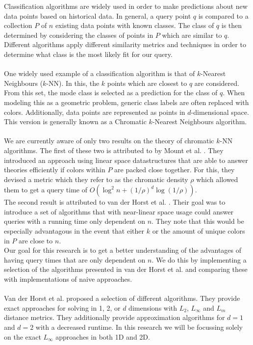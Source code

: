 \documentclass{article}
\newcommand{\fb}[1]{{\color{blue}#1}}
\begin{document}
\fb{
    Classification algorithms are widely used in order to make predictions about new data points based on historical data. In general, a query point $q$ is compared to a collection $P$ of $n$ existing data points with known classes. The class of $q$ is then determined by considering the classes of points in $P$ which are similar to $q$. Different algorithms apply different similarity metrics and techniques in order to determine what class is the most likely fit for our query. \\\\
    One widely used example of a classification algorithm is that of $k$-Nearest Neighbours ($k$-NN). In this, the $k$ points which are closest to $q$ are considered. From this set, the mode class is selected as a prediction for the class of $q$. When modeling this as a geometric problem, generic class labels are often replaced with colors. Additionally, data points are represented as points in $d$-dimensional space. This version is generally known as a Chromatic $k$-Nearest Neighbours algorithm. \\\\
    We are currently aware of only two results on the theory of chromatic $k$-NN algorithms. The first of these two is attributed to by Mount et al. \cite{MOUNT200097}. They introduced an approach using linear space datastructures that are able to answer theories efficiently if colors within $P$ are packed close together. For this, they devised a metric which they refer to as the chromatic density $\rho$ which allowed them to get a query time of $O(\log^2 n + (1/\rho)^d\log(1/\rho))$.\\
    The second result is attributed to van der Horst et al. \cite{vanderhorst_et_al:LIPIcs.ESA.2022.67}. Their goal was to introduce a set of algorithms that with near-linear space usage could answer queries with a running time only dependent on $n$. They note that this would be especially advantagous in the event that either $k$ or the amount of unique colors in $P$ are close to $n$. \\
    Our goal for this research is to get a better understanding of the advantages of having query times that are only dependent on $n$. We do this by implementing a selection of the algorithms presented in van der Horst et al. and comparing these with implementations of naive approaches. \\\\
    Van der Horst et al. proposed a selection of different algorithms. They provide exact approaches for solving in 1, 2, or $d$ dimensions with $L_2$, $L_\infty$ and $L_m$ distance metrics. They additionally provide approximation algorithms for $d=1$ and $d=2$ with a decreased runtime. In this research we will be focussing solely on the exact $L_\infty$ approaches in both 1D and 2D. \\
}
\end{document}
